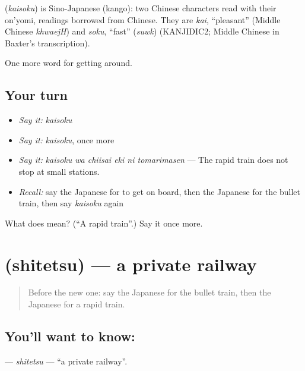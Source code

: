 \begin{cousinweb}
\textbf{} (\emph{kaisoku}) is Sino-Japanese (kango): two Chinese characters read with their on'yomi, readings borrowed from Chinese. They are \emph{kai}, \textquotedblleft{}pleasant\textquotedblright{} (Middle Chinese \emph{khwaejH}) and \emph{soku}, \textquotedblleft{}fast\textquotedblright{} (\emph{suwk}) (KANJIDIC2; Middle Chinese in Baxter's transcription).
\end{cousinweb}

\begin{grammarlens}[title={What you've built}]
One more word for getting around.
\end{grammarlens}

\subsection*{Your turn}
\begin{itemize}
\raggedright
  \item \emph{Say it:} \emph{kaisoku}
  \item \emph{Say it:} \emph{kaisoku}, once more
  \item \emph{Say it:} \emph{kaisoku wa chiisai eki ni tomarimasen} — The rapid train does not stop at small stations.
  \item \emph{Recall:} say the Japanese for to get on board, then the Japanese for the bullet train, then say \emph{kaisoku} again
\end{itemize}

\begin{tcolorbox}[breakable,colback=teal!4,colframe=teal!35!black,title={Before you move on}]
What does  mean? (\textquotedblleft{}A rapid train\textquotedblright{}.) Say it once more.
\end{tcolorbox}
\section[\texorpdfstring{\ja{してつ} (shitetsu)}{してつ (shitetsu)}]{ (shitetsu) — a private railway}

\label{lesson:JA-C376-shitetsu}



\begin{quote}
Before the new one: say the Japanese for the bullet train, then the Japanese for a rapid train.
\end{quote}

\subsection*{You'll want to know: }
\textbf{} — \emph{shitetsu} — \textquotedblleft{}a private railway\textquotedblright{}.

